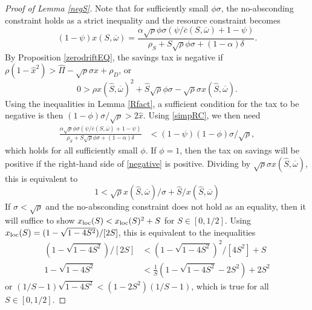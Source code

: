 \documentclass[11pt]{article}
\theoremstyle{plain}
\theoremstyle{definition} %
\begin{document}
\begin{proof}[Proof of Lemma \ref{negS}]
Note that for sufficiently small $\phi\sigma$, the no-absconding constraint holds as a strict inequality and the resource constraint becomes
\begin{equation}
(1-\psi)x(S, \overline{\omega}) = \frac{\alpha \sqrt{\rho}\phi \sigma(\psi/\overline{c}(S, \overline{\omega}) + 1-\psi)}{\rho_S + S\sqrt{\rho}\phi \sigma + (1-\alpha)\delta}.
\label{simpRC}
\end{equation} 
By Proposition \ref{zerodriftEQ}, the savings tax is negative if $\rho(1-\hat{x}^2) > \hat{\Pi} - \sqrt{\rho} \sigma \hat{x} + \rho_D$, or 
\begin{equation}
0 > \rho x(\hat{S},\overline{\omega})^2 + \hat{S}\sqrt{\rho}\phi \sigma - \sqrt{\rho} \sigma x(\hat{S},\overline{\omega}).
\label{negative}
\end{equation} 
Using the inequalities in Lemma \ref{Rfact}, a sufficient condition for the tax to be negative is then $(1-\phi) \sigma/\sqrt{\rho} > 2\hat{x}$. Using \eqref{simpRC}, we then need
\begin{align*}
\frac{\alpha \sqrt{\rho}\phi \sigma(\psi/\overline{c}(S, \overline{\omega}) + 1-\psi)}{\rho_S + S\sqrt{\rho}\phi \sigma + (1-\alpha)\delta} & < (1-\psi)(1-\phi) \sigma/\sqrt{\rho},
\end{align*}
which holds for all sufficiently small $\phi$. If $\phi=1$, then the tax on savings will be positive if the right-hand side of \eqref{negative} is positive. Dividing by $\sqrt{\rho} \sigma x(\hat{S},\overline{\omega})$, this is equivalent to
\begin{equation}
1 < \sqrt{\rho} x(\hat{S},\overline{\omega})/\sigma + \hat{S}/x(\hat{S},\overline{\omega})
\label{smallsig}
\end{equation}
If $\sigma < \sqrt{\rho}$ and the no-absconding constraint does not hold as an equality, then it will suffice to show $x_{\textnormal{loc}}(S) < x_{\textnormal{loc}}(S)^2 + S$ for $S \in [0,1/2]$. Using $x_{\textnormal{loc}}(S) = (1 - \sqrt{1-4S^2})/[2S]$, this is equivalent to the inequalities
\begin{align*}
(1 - \sqrt{1-4S^2})/[2S] & < (1 - \sqrt{1-4S^2})^2/[4S^2] + S
\\ 1 - \sqrt{1-4S^2} & < \frac{1}{S}(1 - \sqrt{1-4S^2} - 2S^2) + 2S^2
\end{align*}
or $(1/S-1)\sqrt{1-4S^2} < (1 - 2S^2)(1/S - 1)$, which is true for all $S\in [0,1/2]$.
\end{proof} 
\end{document}
